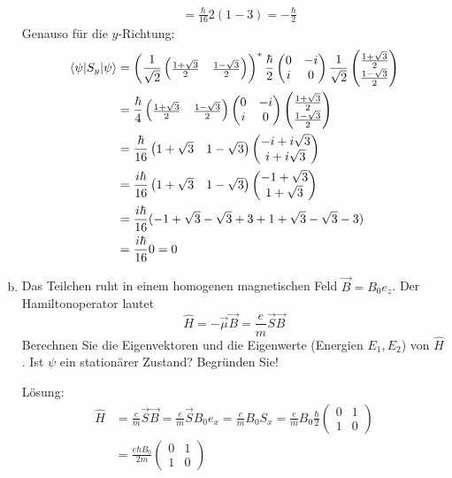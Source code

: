 \documentclass{scrartcl}
\newcommand{\Sx}{\begin{pmatrix}0&1\\1&0\end{pmatrix}}
\begin{document}
\begin{enumerate}[a)]
\begin{align*}
	&=
	\frac \hbar {16} 2 (1 - 3) = -\frac \hbar 2
\end{align*}
Genauso für die $y$-Richtung:
\begin{align*}
\braket{\psi|S_y|\psi}	
	&= 
	\left(\frac 1{\sqrt 2} \begin{pmatrix}\frac{1+\sqrt 3}{2} & \frac{1-\sqrt 3}{2}\end{pmatrix}\right)^\ast
	\frac \hbar 2 \begin{pmatrix} 0&-i\\i&0 \end{pmatrix}
	\frac 1{\sqrt 2}\begin{pmatrix}\frac{1+\sqrt 3}{2}\\\frac{1-\sqrt 3}{2}\end{pmatrix}\\
	&= 	
	\frac \hbar 4 \begin{pmatrix}\frac{1+\sqrt 3}{2} & \frac{1-\sqrt 3}{2}\end{pmatrix}
	\begin{pmatrix} 0&-i\\i&0 \end{pmatrix}
	\begin{pmatrix}\frac{1+\sqrt 3}{2}\\\frac{1-\sqrt 3}{2}\end{pmatrix}\\
	&=
	\frac \hbar {16} \begin{pmatrix}1+\sqrt 3 & 1-\sqrt 3\end{pmatrix}
	\begin{pmatrix}-i+i\sqrt 3\\i+i\sqrt 3\end{pmatrix}\\
	&=
	\frac {i\hbar}{16} \begin{pmatrix}1+\sqrt 3 & 1-\sqrt 3\end{pmatrix}
	\begin{pmatrix}-1+\sqrt 3\\1+\sqrt 3\end{pmatrix}\\
	&=
	\frac {i\hbar}{16} (-1 + \sqrt 3 -\sqrt 3 + 3 + 1 + \sqrt 3  -\sqrt 3 -3) \\
	&=
	\frac{i\hbar}{16} 0 = 0
\end{align*}

\item Das Teilchen ruht in einem homogenen magnetischen Feld $\vec B = B_0 e_z$. Der Hamiltonoperator lautet
\[\hat H = -\vec \mu \vec B = \frac em \vec S \vec B \]
Berechnen Sie die Eigenvektoren und die Eigenwerte (Energien $E_1, E_2$) von $\hat H$. Ist $\psi$ ein stationärer Zustand? Begründen Sie!
\item[Lösung:]
\begin{align*}
\hat H &= \frac em \vec S \vec B = \frac em \vec S B_0 e_x = \frac em B_0 S_x = \frac em B_0 \frac \hbar 2 \begin{pmatrix}0&1\\1&0\end{pmatrix} \\
&= \frac{e\hbar B_0}{2m}\Sx
\end{align*}


\end{enumerate}
\end{document}
